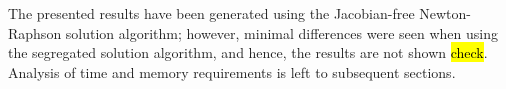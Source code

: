 \documentclass[sn-mathphys,Numbered]{sn-jnl}%
\begin{document}
The presented results have been generated using the Jacobian-free Newton-Raphson solution algorithm; however, minimal differences were seen when using the segregated solution algorithm, and hence, the results are not shown \hl{check}.
Analysis of time and memory requirements is left to subsequent sections.



%
%
\end{document}
